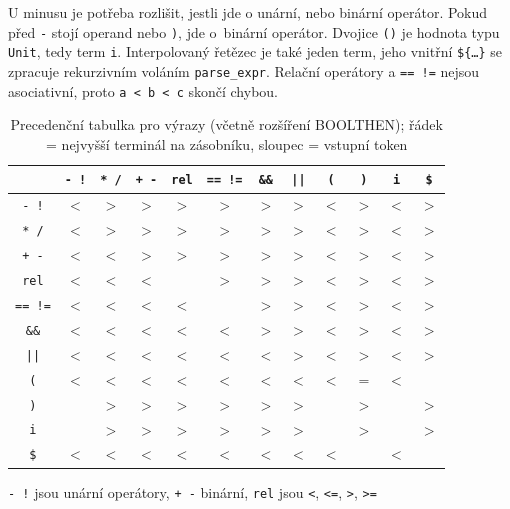 \documentclass[a4paper,11pt]{article}
\newcommand{\id}[1]{\texttt{#1}}
\newcommand{\term}[1]{\texttt{#1}}
\begin{document}
U minusu je potřeba rozlišit, jestli jde o unární, nebo binární operátor. Pokud před
\term{-} stojí operand nebo \term{)}, jde o~binární operátor. Dvojice
\term{()} je hodnota typu \term{Unit}, tedy term \term{i}. Interpolovaný
řetězec je také jeden term, jeho vnitřní \term{\$\{\dots\}} se zpracuje
rekurzivním voláním \id{parse\_expr}. Relační operátory a \term{== !=}
nejsou asociativní, proto \texttt{a < b < c} skončí chybou.

\begin{table}[H]
  \centering
  \caption{Precedenční tabulka pro výrazy (včetně rozšíření BOOLTHEN);
           řádek = nejvyšší terminál na zásobníku, sloupec = vstupní token}
  \label{tab:prec}
  \begin{tabular}{|c|*{11}{c|}}
    \hline
               & \term{- !} & \term{* /} & \term{+ -} & \term{rel} & \term{== !=} & \term{\&\&} & \term{||} & \term{(} & \term{)} & \term{i} & \term{\$} \\ \hline
    \term{- !}   & $<$ & $>$ & $>$ & $>$ & $>$ & $>$ & $>$ & $<$ & $>$ & $<$ & $>$ \\ \hline
    \term{* /}   & $<$ & $>$ & $>$ & $>$ & $>$ & $>$ & $>$ & $<$ & $>$ & $<$ & $>$ \\ \hline
    \term{+ -}   & $<$ & $<$ & $>$ & $>$ & $>$ & $>$ & $>$ & $<$ & $>$ & $<$ & $>$ \\ \hline
    \term{rel}   & $<$ & $<$ & $<$ &     & $>$ & $>$ & $>$ & $<$ & $>$ & $<$ & $>$ \\ \hline
    \term{== !=} & $<$ & $<$ & $<$ & $<$ &     & $>$ & $>$ & $<$ & $>$ & $<$ & $>$ \\ \hline
    \term{\&\&}  & $<$ & $<$ & $<$ & $<$ & $<$ & $>$ & $>$ & $<$ & $>$ & $<$ & $>$ \\ \hline
    \term{||}    & $<$ & $<$ & $<$ & $<$ & $<$ & $<$ & $>$ & $<$ & $>$ & $<$ & $>$ \\ \hline
    \term{(}     & $<$ & $<$ & $<$ & $<$ & $<$ & $<$ & $<$ & $<$ & $=$ & $<$ &     \\ \hline
    \term{)}     &     & $>$ & $>$ & $>$ & $>$ & $>$ & $>$ &     & $>$ &     & $>$ \\ \hline
    \term{i}     &     & $>$ & $>$ & $>$ & $>$ & $>$ & $>$ &     & $>$ &     & $>$ \\ \hline
    \term{\$}    & $<$ & $<$ & $<$ & $<$ & $<$ & $<$ & $<$ & $<$ &     & $<$ &     \\ \hline
  \end{tabular}

  \vspace{0.2cm}
  \small \term{- !} jsou unární operátory, \term{+ -} binární, \term{rel} jsou \term{<}, \term{<=}, \term{>}, \term{>=}
\end{table}
\end{document}
